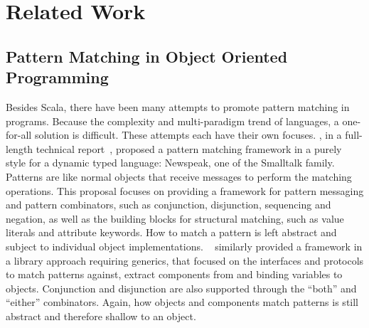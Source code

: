 
\chapter{Related Work}\label{ch:related}
\minitoc

\section[Pattern Matching in OOP]{Pattern Matching in Object Oriented Programming}

Besides Scala, there have been many attempts to promote pattern matching in {\OO} programs.
Because the complexity and multi-paradigm trend of {\OO} languages, a one-for-all solution is difficult.
These attempts each have their own focuses.
, in a full-length technical report~\cite{geller2010pattern},
proposed a pattern matching framework in a purely {\OO} style for a dynamic typed language: Newspeak, one of the Smalltalk family.
Patterns are like normal objects that receive messages to perform the matching operations.
This proposal focuses on providing a framework for pattern messaging and pattern combinators, such as conjunction, disjunction, sequencing and negation,
as well as the building blocks for structural matching, such as value literals and attribute keywords.
How to match a pattern is left abstract and subject to individual object implementations.
~\cite{y2012paisley} similarly provided a framework in a library approach requiring generics,
that focused on the interfaces and protocols to match patterns against, extract components from and binding variables to objects.
Conjunction and disjunction are also supported through the ``both'' and ``either'' combinators.
Again, how objects and components match patterns is still abstract and therefore shallow to an object.

